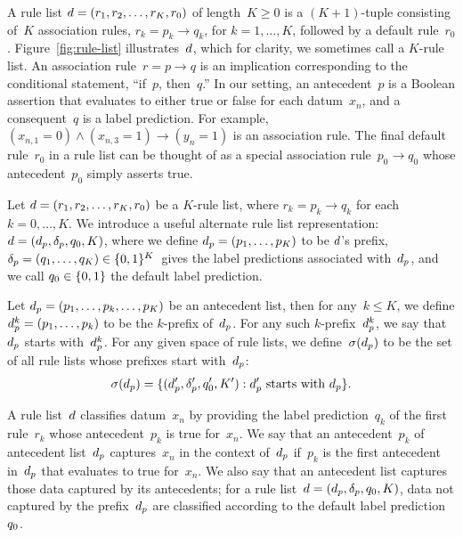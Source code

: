 A rule list ${{d} = (r_1, r_2, \dots, r_K, r_0)}$ of length~${K \ge 0}$
is a ${(K+1)}$-tuple consisting of~$K$ association rules,
${r_k = p_k \rightarrow q_k}$, for ${k = 1, \dots, K}$,
followed by a default rule~$r_0$.
%
Figure~\ref{fig:rule-list} illustrates~${d}$,
which for clarity, we sometimes call a $K$-rule list.
%
An association rule~${r = p \rightarrow q}$ is an implication
corresponding to the conditional statement, ``if~$p$, then~$q$.''
%
In our setting, an antecedent~$p$ is a Boolean assertion that
evaluates to either true or false for each datum~$x_n$,
and a consequent~$q$ is a label prediction.
%
For example, ${(x_{n, 1} = 0) \wedge (x_{n, 3} = 1) \rightarrow (y_n = 1)}$
is an association rule.
%
%
The final default rule~$r_0$ in a rule list can be thought of
as a special association rule~${p_0 \rightarrow q_0}$
whose antecedent~$p_0$ simply asserts true.

Let ${{d} = (r_1, r_2, \dots, r_K, r_0)}$ be a $K$-rule list,
where ${r_k = p_k \rightarrow q_k}$ for each ${k = 0, \dots, K}$.
%
We introduce a useful alternate rule list representation:
${{d} = (d_p, \delta_p, q_0, K)}$,
where we define ${d_p = (p_1, \dots, p_K)}$ to be ${d}$'s prefix,
${\delta_p = (q_1, \dots, q_K) \in \{0, 1\}^K}$~gives
the label predictions associated with~$d_p$,
and we call ${q_0 \in \{0, 1\}}$ the default label prediction.

Let ${d_p = (p_1, \dots, p_k, \dots, p_K)}$ be an antecedent list,
then for any~${k \le K}$, we define ${d_p^k = (p_1, \dots, p_k)}$
to be the $k$-prefix of~$d_p$.
%
For any such $k$-prefix~$d_p^k$,
we say that~$d_p$ starts with~$d_p^k$.
%
For any given space of rule lists,
we define~$\sigma(d_p)$ to be the set of
all rule lists whose prefixes start with~$d_p$:
\begin{align}
\StartsWith(\Prefix) =
\{(\Prefix', \Labels', \Default', K') : \Prefix' \textnormal{ starts with } \Prefix \}.
\end{align}

A rule list~${d}$ classifies datum~$x_n$ by providing the label prediction~$q_k$
of the first rule~$r_k$ whose antecedent~$p_k$ is true for~$x_n$.
%
We say that an antecedent~$p_k$ of antecedent list~$d_p$ captures~$x_n$
in the context of~$d_p$ if~$p_k$ is the first antecedent in~$d_p$ that
evaluates to true for~$x_n$.
%
We also say that an antecedent list captures those data captured by its antecedents;
for a rule list~${{d} = (d_p, \delta_p, q_0, K)}$,
data not captured by the prefix~$d_p$
are classified according to the default label prediction~$q_0$.

